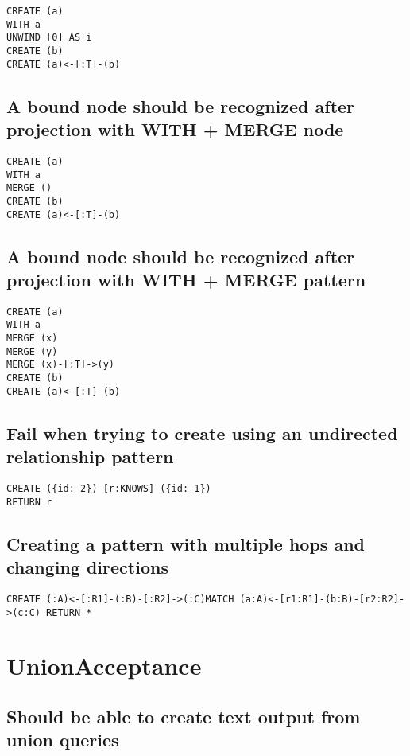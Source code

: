 \begin{lstlisting}
CREATE (a)
WITH a
UNWIND [0] AS i
CREATE (b)
CREATE (a)<-[:T]-(b)
\end{lstlisting}

\subsection{A bound node should be recognized after projection with WITH + MERGE node}

\begin{lstlisting}
CREATE (a)
WITH a
MERGE ()
CREATE (b)
CREATE (a)<-[:T]-(b)
\end{lstlisting}

\subsection{A bound node should be recognized after projection with WITH + MERGE pattern}

\begin{lstlisting}
CREATE (a)
WITH a
MERGE (x)
MERGE (y)
MERGE (x)-[:T]->(y)
CREATE (b)
CREATE (a)<-[:T]-(b)
\end{lstlisting}

\subsection{Fail when trying to create using an undirected relationship pattern}

\begin{lstlisting}
CREATE ({id: 2})-[r:KNOWS]-({id: 1})
RETURN r
\end{lstlisting}

\subsection{Creating a pattern with multiple hops and changing directions}

\begin{lstlisting}
CREATE (:A)<-[:R1]-(:B)-[:R2]->(:C)MATCH (a:A)<-[r1:R1]-(b:B)-[r2:R2]->(c:C) RETURN *
\end{lstlisting}
\section{UnionAcceptance}


\subsection{Should be able to create text output from union queries}

